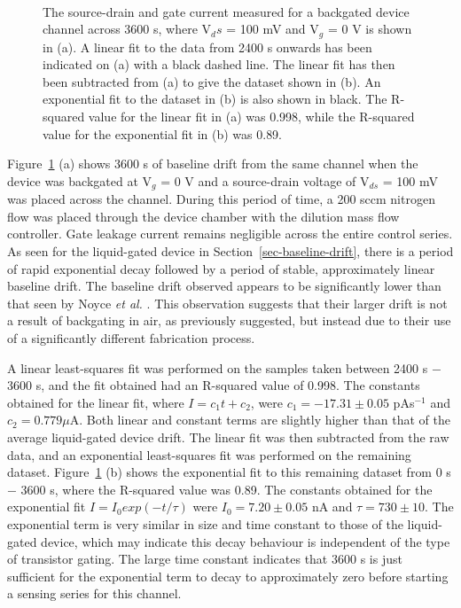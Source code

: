 \documentclass[
  a4paper,
]{scrbook}
\begin{document}
\begin{figure}
\begin{minipage}[t]{0.70\linewidth}
{}

\end{minipage}%
%
\begin{minipage}[t]{0.15\linewidth}

{\centering 

~

}

\end{minipage}%

\caption{\label{fig-bg-baseline-drift}The source-drain and gate current
measured for a backgated device channel across 3600 s, where V\(_ds\) =
100 mV and V\(_g\) = 0 V is shown in (a). A linear fit to the data from
2400 s onwards has been indicated on (a) with a black dashed line. The
linear fit has then been subtracted from (a) to give the dataset shown
in (b). An exponential fit to the dataset in (b) is also shown in black.
The R-squared value for the linear fit in (a) was 0.998, while the
R-squared value for the exponential fit in (b) was 0.89.}

\end{figure}

Figure~\ref{fig-bg-baseline-drift} (a) shows 3600 s of baseline drift
from the same channel when the device was backgated at V\(_g\) = 0 V and
a source-drain voltage of V\(_{ds}\) = 100 mV was placed across the
channel. During this period of time, a 200 sccm nitrogen flow was placed
through the device chamber with the dilution mass flow controller. Gate
leakage current remains negligible across the entire control series. As
seen for the liquid-gated device in Section~\ref{sec-baseline-drift},
there is a period of rapid exponential decay followed by a period of
stable, approximately linear baseline drift. The baseline drift observed
appears to be significantly lower than that seen by Noyce \emph{et al.}
\autocite{Noyce2019}. This observation suggests that their larger drift
is not a result of backgating in air, as previously suggested, but
instead due to their use of a significantly different fabrication
process.

A linear least-squares fit was performed on the samples taken between
2400 s \(-\) 3600 s, and the fit obtained had an R-squared value of
0.998. The constants obtained for the linear fit, where
\(I = c_1t + c_2\), were \(c_1 = -17.31\pm0.05\) pAs\(^{-1}\) and
\(c_2 = 0.779 \mu\)A. Both linear and constant terms are slightly higher
than that of the average liquid-gated device drift. The linear fit was
then subtracted from the raw data, and an exponential least-squares fit
was performed on the remaining dataset.
Figure~\ref{fig-bg-baseline-drift} (b) shows the exponential fit to this
remaining dataset from 0 s \(-\) 3600 s, where the R-squared value was
0.89. The constants obtained for the exponential fit
\(I = I_0exp(-t/\tau)\) were \(I_0 = 7.20 \pm 0.05\) nA and
\(\tau = 730 \pm 10\). The exponential term is very similar in size and
time constant to those of the liquid-gated device, which may indicate
this decay behaviour is independent of the type of transistor gating.
The large time constant indicates that 3600 s is just sufficient for the
exponential term to decay to approximately zero before starting a
sensing series for this channel.
\end{document}
